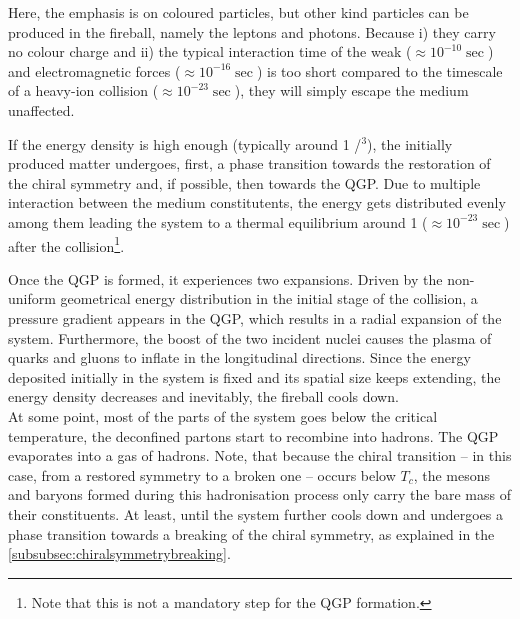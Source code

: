 Here, the emphasis is on coloured particles, but other kind particles can be produced in the fireball, namely the leptons and photons. Because i) they carry no colour charge and ii) the typical interaction time of the weak ($\approx 10^{-10} \sec$) and electromagnetic forces ($\approx 10^{-16} \sec$) is too short compared to the timescale of a heavy-ion collision ($\approx 10^{-23} \sec$), they will simply escape the medium unaffected.



If the energy density is high enough (typically around 1 \gev/\fm$^{3}$), the initially produced matter undergoes, first, a phase transition towards the restoration of the chiral symmetry and, if possible, then towards the QGP. Due to multiple interaction between the medium constitutents, the energy gets distributed evenly among them leading the system to a thermal equilibrium around 1 \fmC ($\approx 10^{-23} \sec$) after the collision\footnote{Note that this is not a mandatory step for the QGP formation.}. 

Once the QGP is formed, it experiences two expansions. Driven by the non-uniform geometrical energy distribution in the initial stage of the collision, a pressure gradient appears in the QGP, which results in a radial expansion of the system. Furthermore, the boost of the two incident nuclei causes the plasma of quarks and gluons to inflate in the longitudinal directions. Since the energy deposited initially in the system is fixed and its spatial size keeps extending, the energy density decreases and inevitably, the fireball cools down.\\

At some point, most of the parts of the system goes below the critical temperature, the deconfined partons start to recombine into hadrons. The QGP evaporates into a gas of hadrons. Note, that because the chiral transition -- in this case, from a restored symmetry to a broken one -- occurs below $T_{c}$, the mesons and baryons formed during this hadronisation process only carry the bare mass of their constituents. At least, until the system further cools down and undergoes a phase transition towards a breaking of the chiral symmetry, as explained in the \Sec\ref{subsubsec:chiralsymmetrybreaking}.


